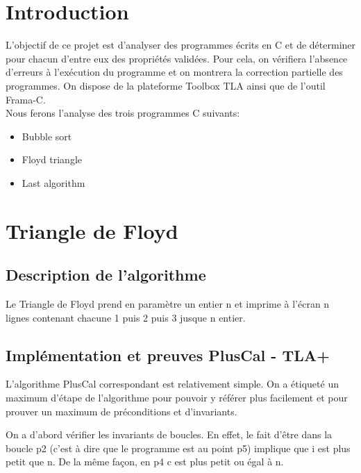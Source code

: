\documentclass[a4paper,11pt, oneside]{book}
\author{Romain Cahu, Victor Cholley-Barroyer, Yann Prono, Quentin Tardivon}
\date{\today}
\begin{document}
	\begin{titlepage}
		
	\end{titlepage}

	\newpage\newpage\null\thispagestyle{empty}
	\newpage
		\tableofcontents
		\thispagestyle{empty}

	\chapter{Introduction}
	\setcounter{page}{1}

		L'objectif de ce projet est d'analyser des programmes écrits en C et de déterminer pour chacun d'entre eux des
		propriétés validées. Pour cela, on vérifiera l'absence d'erreurs à l'exécution du programme et on montrera la correction partielle des programmes.
		On dispose de la plateforme Toolbox TLA ainsi que de l'outil Frama-C.\\

		\noindent Nous ferons l'analyse des trois programmes C suivants:
		\begin{itemize}
			\item Bubble sort
			\item Floyd triangle
			\item Last algorithm
		\end{itemize}

	\chapter{Triangle de Floyd}

		\section{Description de l'algorithme}

		Le Triangle de Floyd prend en paramètre un entier n et imprime à l'écran
		n lignes contenant chacune 1 puis 2 puis 3 jusque n entier.


		\section{Implémentation et preuves PlusCal - TLA+}

			L'algorithme PlusCal correspondant est relativement simple. On a étiqueté
			un maximum d'étape de l'algorithme pour pouvoir y référer plus facilement
			et pour prouver un maximum de préconditions et d'invariants.

			On a d'abord vérifier les invariants de boucles. En effet, le fait d'être
			dans la boucle p2 (c'est à dire que le programme est au point p5) implique
			que i est plus petit que n. De la même façon, en p4 c est plus petit ou égal
			à n.
\end{document}
